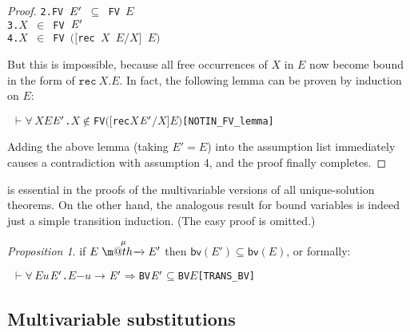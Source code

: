 \documentclass[GCNS]{yincog}
\makeatletter
\renewcommand{\HOLinline}[1]{\mbox{\textup{\texttt{#1}}}}
\renewcommand{\HOLConst}[1]{\texttt{#1}}
\renewcommand{\HOLBoundVar}[1]{\ensuremath{\mathit{#1}}}
\renewcommand{\HOLFreeVar}[1]{\ensuremath{\mathit{#1}}}
\renewcommand{\HOLSymConst}[1]{#1}
\renewcommand{\HOLTokenIn}{\ensuremath{\in}}
\renewcommand{\HOLTokenSubset}{\ensuremath{\subseteq}}
\def \rightarrowfill{$\m@th\mathord{\smash-}\mkern-6mu%
  \cleaders\hbox{$\mkern-2mu\mathord{\smash-}\mkern-2mu$}\hfill
  \mkern-6mu\mathord\rightarrow$}
\renewcommand{\HOLTokenForall}{\ensuremath{\forall \,}}
\renewcommand{\HOLTokenNotIn}{\ensuremath{\notin}}
\renewcommand{\HOLTokenTurnstile}{\ensuremath{\:\:\vdash}}
\theoremstyle{remark}
\theoremstyle{theorem}
\newtheorem{proposition}[definition]{Proposition}
\theoremstyle{remark}
\newcommand{\HOLTokenTransBegin}{$-$}
\newcommand{\HOLTokenTransEnd}{$\rightarrow$\xspace}
\renewcommand{\HOLTokenImp}{\ensuremath{\Longrightarrow}}
\newcommand{\multivariate}{multivariable\xspace}
\newcommand{\Multivariate}{Multivariable\xspace}
\def\bvvtex#1{\rmsf{bv}(#1)}
\newcommand{\arr}[1]{\mathrel{\stackrel{{\;\;#1\;\;}}{\mbox{\rightarrowfill}}}}
\newcommand{\rmsf}[1]{{\mathsf{{#1}}}}
\newcommand{\recu}[2]{\mathtt{rec}\: #1 . #2}
\makeatother
\begin{document}
\begin{proof}
\begin{alltt}
    2.  \HOLinline{\HOLConst{FV} \ensuremath{\HOLFreeVar{E}\sp{\prime}} \HOLSymConst{\HOLTokenSubset{}} \HOLConst{FV} \HOLFreeVar{E}}
    3.  \HOLinline{\HOLFreeVar{X} \HOLSymConst{\HOLTokenIn{}} \HOLConst{FV} \ensuremath{\HOLFreeVar{E}\sp{\prime}}}
    4.  \HOLinline{\HOLFreeVar{X} \HOLSymConst{\HOLTokenIn{}} \HOLConst{FV} \ensuremath{(}\ensuremath{[}\HOLConst{rec} \HOLFreeVar{X} \HOLFreeVar{E}\ensuremath{/}\HOLFreeVar{X}\ensuremath{]} \HOLFreeVar{E}\ensuremath{)}}
\end{alltt}
%
But this is impossible, because all free occurrences of $X$ in $E$ now
become bound in the form of $\recu X E$. In fact, the following lemma can
be proven by induction on $E$:
%
\begin{alltt}
\HOLTokenTurnstile{} \HOLSymConst{\HOLTokenForall{}}\HOLBoundVar{X} \HOLBoundVar{E} \ensuremath{\HOLBoundVar{E}\sp{\prime}}. \HOLBoundVar{X} \HOLSymConst{\HOLTokenNotIn{}} \HOLConst{FV} \ensuremath{(}\ensuremath{[}\HOLConst{rec} \HOLBoundVar{X} \ensuremath{\HOLBoundVar{E}\sp{\prime}}\ensuremath{/}\HOLBoundVar{X}\ensuremath{]} \HOLBoundVar{E}\ensuremath{)}\hfill{[NOTIN\_FV\_lemma]}
\end{alltt}
%
Adding the above lemma (taking $E' = E$) into the assumption list immediately
causes a contradiction with assumption 4, and the proof finally completes.
\end{proof}

 is essential in the proofs of the
\multivariate versions of all unique-solution theorems. On the other hand,
the analogous result for bound variables is indeed just a simple transition
induction. (The easy proof is omitted.)
%
\begin{proposition}
 \label{prop:transBV}
if $E \arr{\mu} E'$ then $\bvvtex{E'} \subseteq \bvvtex{E}$, or formally:
%
\begin{alltt}
\HOLTokenTurnstile{} \HOLSymConst{\HOLTokenForall{}}\HOLBoundVar{E} \HOLBoundVar{u} \ensuremath{\HOLBoundVar{E}\sp{\prime}}. \HOLBoundVar{E} \HOLTokenTransBegin\HOLBoundVar{u}\HOLTokenTransEnd \ensuremath{\HOLBoundVar{E}\sp{\prime}} \HOLSymConst{\HOLTokenImp{}} \HOLConst{BV} \ensuremath{\HOLBoundVar{E}\sp{\prime}} \HOLSymConst{\HOLTokenSubset{}} \HOLConst{BV} \HOLBoundVar{E}\hfill{[TRANS\_BV]}
\end{alltt}
%
\end{proposition}

\subsection{\Multivariate substitutions}
 \label{sec5.2}
\end{document}
